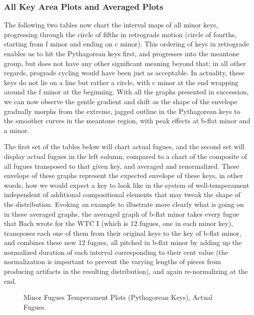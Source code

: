 \subsubsection{All Key Area Plots and Averaged
Plots}\label{all-key-area-plots-and-averaged-plots}

The following two tables now chart the interval maps of all minor keys,
progressing through the circle of fifths in retrograde motion (circle of
fourths, starting from f minor and ending on c minor). This ordering of
keys in retrograde enables us to hit the Pythagorean keys first, and
progresses into the meantone group, but does not have any other
significant meaning beyond that; in all other regards, prograde cycling
would have been just as acceptable. In actuality, these keys do not lie
on a line but rather a circle, with c minor at the end wrapping around
the f minor at the beginning. With all the graphs presented in
succession, we can now observe the gentle gradient and shift as the
shape of the envelope gradually morphs from the extreme, jagged outline
in the Pythagorean keys to the smoother curves in the meantone region,
with peak effects at b-flat minor and a minor.

The first set of the tables below will chart actual fugues, and the
second set will display actual fugues in the left column, compared to a
chart of the composite of all fugues transposed to that given key, and
averaged and renormalized. These envelope of these graphs represent the
expected envelope of these keys, in other words, how we would expect a
key to look like in the system of well-temperament independent of
additional compositional elements that may tweak the shape of the
distribution. Evoking an example to illustrate more clearly what is
going on in these averaged graphs, the averaged graph of b-flat minor
takes every fugue that Bach wrote for the WTC I (which is 12 fugues, one
in each minor key), transposes each one of them from their original keys
to the key of b-flat minor, and combines these new 12 fugues, all
pitched in b-flat minor by adding up the normalized duration of each
interval corresponding to their cent value (the normalization is
important to prevent the varying lengths of pieces from producing
artifacts in the resulting distribution), and again re-normalizing at
the end.



\begin{figure}[H]
\vspace{1.5em}
    \centering
    \caption{Minor Fugues Temperament Plots (Pythagorean Keys), Actual Fugues. }
\end{figure}

